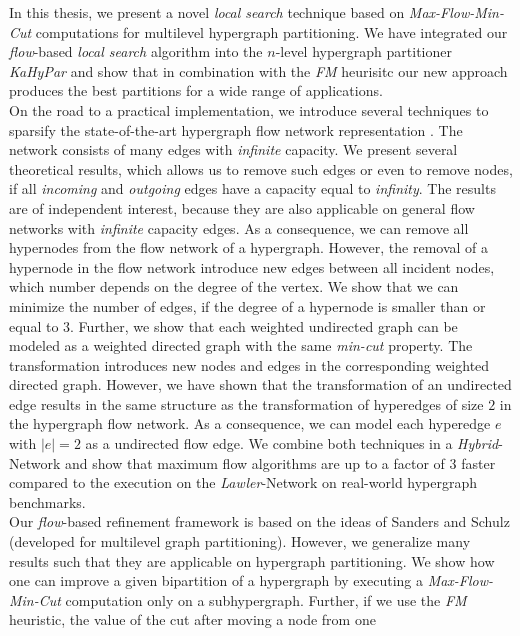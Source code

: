 In this thesis, we present a novel \emph{local search} technique based on \emph{Max-Flow-Min-Cut}
computations for multilevel hypergraph partitioning. We have integrated our \emph{flow}-based
\emph{local search} algorithm into the $n$-level hypergraph partitioner \emph{KaHyPar} and show that
in combination with the \emph{FM} heurisitc our new approach produces the best partitions
for a wide range of applications.\\
On the road to a practical implementation, we introduce several techniques to 
sparsify the state-of-the-art hypergraph flow network representation \cite{lawler1973}. 
The network consists of many edges with \emph{infinite} capacity. We present
several theoretical results, which allows us to remove such edges or even to remove
nodes, if all \emph{incoming} and \emph{outgoing} edges have a capacity equal to
\emph{infinity}. The results are of independent interest, because they are also
applicable on general flow networks with \emph{infinite} capacity edges. 
As a consequence, we can remove all hypernodes from the flow network 
of a hypergraph. However, the removal of a hypernode in the flow 
network introduce new edges between all incident nodes, which number depends
on the degree of the vertex. We show that we can minimize the number of edges, if the
degree of a hypernode is smaller than or equal to $3$. Further, we show that each weighted undirected
graph can be modeled as a weighted directed graph with the same \emph{min-cut}
property. The transformation introduces new nodes and edges in the corresponding
weighted directed graph. However, we have shown that the transformation of an undirected
edge results in the same structure as the transformation of hyperedges of size $2$
in the hypergraph flow network. As a consequence, we can model each hyperedge $e$ with
$|e| = 2$ as a undirected flow edge. We combine both techniques in a \emph{Hybrid}-Network 
and show that maximum flow algorithms are up to a factor of $3$ faster compared to
the execution on the \emph{Lawler}-Network \cite{lawler1973} on real-world hypergraph benchmarks. \\
Our \emph{flow}-based refinement framework is based on the ideas of Sanders and Schulz
\cite{sanders2011engineering} (developed for multilevel graph partitioning). However,
we generalize many results such that they are applicable on hypergraph partitioning.
We show how one can improve a given bipartition of a hypergraph by executing
a \emph{Max-Flow-Min-Cut} computation only on a subhypergraph. 
Further, if we use the \emph{FM} heuristic, the value of the cut after moving a node from one 
